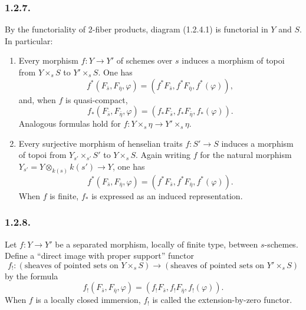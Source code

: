\subsubsection*{1.2.7.}
By the functoriality of 2-fiber products, diagram (1.2.4.1) is
functorial in $Y$ and $S$.  In particular:
\begin{enumerate}[label=\alph*)]
\item Every morphism $f:Y\longrightarrow Y'$ of schemes over $s$
induces a morphism of topoi from $Y\times_sS$ to $Y'\times_sS$.  One
has
\begin{equation}\tag{1.2.7.1}
f^*(F_{\bar s},F_{\bar\eta},\varphi)
=(f^*F_{\bar s},f^*F_{\bar\eta},f^*(\varphi)),
\end{equation}
and, when $f$ is quasi-compact,
\begin{equation}\tag{1.2.7.2}
f_*(F_{\bar s},F_{\bar\eta},\varphi)
=(f_*F_{\bar s},f_*F_{\bar\eta},f_*(\varphi)).
\end{equation}
Analogous formulas hold for
$f:Y\times_s\eta\longrightarrow Y'\times_s\eta$.

\item Every surjective morphism of henselian traits
$f:S'\longrightarrow S$ induces a morphism of topoi from
$Y_{s'}\times_{s'}S'$ to $Y\times_sS$.  Again writing $f$ for the
natural morphism
$Y_{s'}=Y\otimes_{k(s)}k(s')\longrightarrow Y$, one has
\begin{equation}\tag{1.2.7.3}
f^*(F_{\bar s},F_{\bar\eta},\varphi)
=(f^*F_{\bar s},f^*F_{\bar\eta},f^*(\varphi)).
\end{equation}
When $f$ is finite, $f_*$ is expressed as an induced representation.
\end{enumerate}

\subsubsection*{1.2.8.}
Let $f:Y\longrightarrow Y'$ be a separated morphism, locally of finite
type, between $s$-schemes.  Define a ``direct image with proper support''
functor
\begin{equation*}
f_!: (\text{sheaves of pointed sets on }Y\times_sS)
\longrightarrow
(\text{sheaves of pointed sets on }Y'\times_sS)
\end{equation*}
by the formula
\begin{equation}\tag{1.2.8.1}
f_!(F_{\bar s},F_{\bar\eta},\varphi)
=(f_!F_{\bar s},f_!F_{\bar\eta},f_!(\varphi)).
\end{equation}
When $f$ is a locally closed immersion, $f_!$ is called the
extension-by-zero functor.

